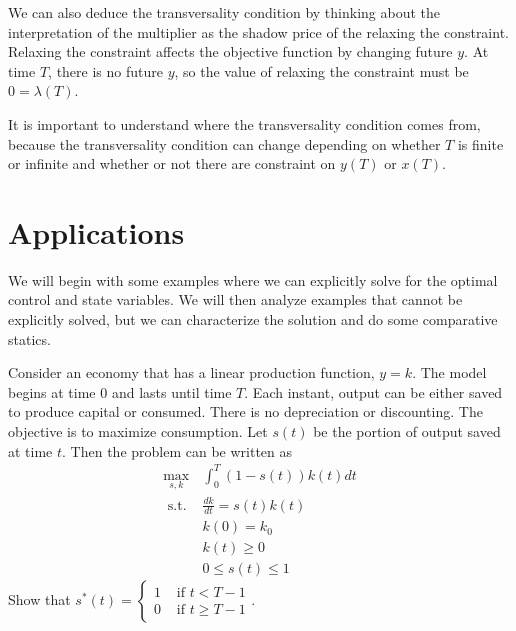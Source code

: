 We can also deduce the transversality condition by thinking about the
interpretation of the multiplier as the shadow price of the relaxing
the constraint. Relaxing the constraint affects the objective function
by changing future $y$. At time $T$, there is no future $y$, so the
value of relaxing the constraint must be $0=\lambda(T)$. 

It is important to understand where the transversality condition comes
from, because the transversality condition can change depending on
whether $T$ is finite or infinite and whether or not there are
constraint on $y(T)$ or $x(T)$. 


\section{Applications}

We will begin with some examples where we can explicitly solve for the
optimal control and state variables. We will then analyze examples
that cannot be explicitly solved, but we can characterize the
solution and do some comparative statics. 

\begin{example}
  Consider an economy that has a linear production function, $y =
  k$. The model begins at time $0$ and lasts until time $T$. Each
  instant, output can be either saved to produce capital or
  consumed. There is no depreciation or discounting. The objective is
  to maximize consumption. Let $s(t)$ be the portion of output saved
  at time $t$. Then the problem can be written as
  \begin{align*}
    \max_{s,k} & \int_0^T (1-s(t)) k(t) dt \\
    \text{ s.t. } & \frac{dk}{dt} = s(t)k(t) \\
    & k(0) = k_0 \\
    & k(t) \geq 0 \\
    & 0 \leq s(t) \leq 1
  \end{align*}
  Show that $s^*(t) = \begin{cases} 1 & \text{ if } t
    < T - 1 \\ 
    0 & \text{ if } t \geq T-1 \end{cases}$. 
\end{example}


